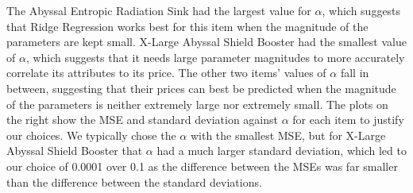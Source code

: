 \documentclass[10pt]{article}
\begin{document}
		\begin{minipage}{0.29\linewidth}
			The Abyssal Entropic Radiation Sink had the largest value for $\alpha$, which suggests that Ridge Regression works best for this item when the magnitude of the parameters are kept small. X-Large Abyssal Shield Booster had the smallest value of $\alpha$, which suggests that it needs large parameter magnitudes to more accurately correlate its attributes to its price. The other two items' values of $\alpha$ fall in between, suggesting that their prices can best be predicted when the magnitude of the parameters is neither extremely large nor extremely small. The plots on the right show the MSE and standard deviation against $\alpha$ for each item to justify our choices. We typically chose the $\alpha$ with the smallest MSE, but for X-Large Abyssal Shield Booster that $\alpha$ had a much larger standard deviation, which led to our choice of 0.0001 over 0.1 as the difference between the MSEs was far smaller than the difference between the standard deviations.
		\end{minipage}\qquad%
\end{document}

